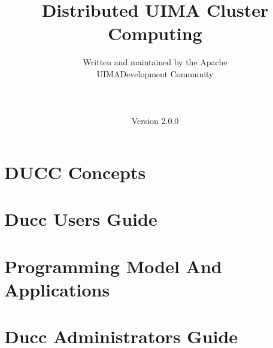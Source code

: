 \documentclass[oneside]{book}
\title{\Huge \textbf{Distributed UIMA Cluster Computing}}
\author{Written and maintained by the Apache\\
UIMA\texttrademark Development Community \\
\\
\\
\\
Version 2.0.0}
\date{}
\begin{document}
\frontmatter
\maketitle



\renewcommand\contentsname{Table of Contents}
\tableofcontents
\listoffigures

\mainmatter



\part{DUCC Concepts}



\part{Ducc Users Guide}


\part{Programming Model And Applications}


\part{Ducc Administrators Guide}


% 
\end{document}
